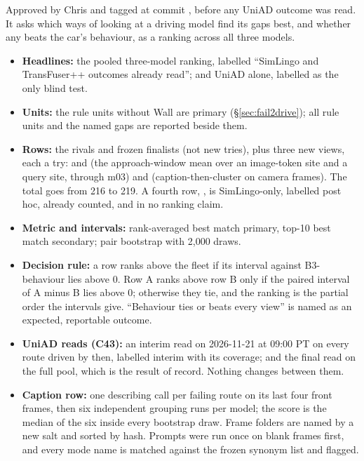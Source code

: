 Approved by Chris and tagged at commit , before any UniAD outcome
was read. It asks which ways of looking at a driving model find its gaps best,
and whether any beats the car's behaviour, as a ranking across all three models.
\begin{itemize}
  \item \textbf{Headlines:} the pooled three-model ranking, labelled ``SimLingo
        and TransFuser++ outcomes already read''; and UniAD alone, labelled as the
        only blind test.
  \item \textbf{Units:} the rule units without Wall are primary
        (\S\ref{sec:fail2drive}); all rule units and the named gaps are reported
        beside them.
  \item \textbf{Rows:} the rivals and frozen finalists (not new tries), plus
        three new views, each a try:  and  (the
        approach-window mean over an image-token site and a query site, through
        m03) and  (caption-then-cluster on camera frames).
        The total goes from 216 to 219. A fourth row, , is
        SimLingo-only, labelled post hoc, already counted, and in no ranking claim.
  \item \textbf{Metric and intervals:} rank-averaged best match primary, top-10
        best match secondary; pair bootstrap with 2{,}000 draws.
  \item \textbf{Decision rule:} a row ranks above the fleet if its interval
        against B3-behaviour lies above 0. Row A ranks above row B only if the
        paired interval of A minus B lies above 0; otherwise they tie, and the
        ranking is the partial order the intervals give. ``Behaviour ties or
        beats every view'' is named as an expected, reportable outcome.
  \item \textbf{UniAD reads (C43):} an interim read on 2026-11-21 at 09:00 PT
        on every route driven by then, labelled interim with its coverage; and
        the final read on the full pool, which is the result of record. Nothing
        changes between them.
  \item \textbf{Caption row:} one describing call per failing route on its last
        four front frames, then six independent grouping runs per model; the
        score is the median of the six inside every bootstrap draw. Frame
        folders are named by a new salt and sorted by hash. Prompts were run once
        on blank frames first, and every mode name is matched against the frozen
        synonym list and flagged.
\end{itemize}

